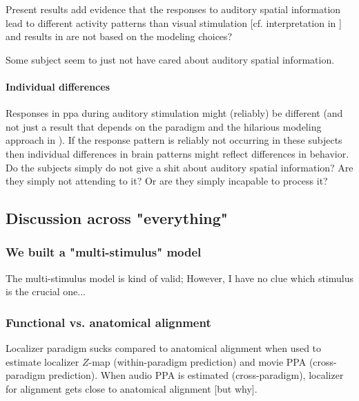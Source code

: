 %
Present results add evidence that the responses to auditory spatial information
lead to different activity patterns than visual stimulation [cf. interpretation
in \citet{haeusler2022processing}] and results in \citet{haeusler2022processing}
are not based on the modeling choices?

%
Some subject seem to just not have cared about auditory spatial information.


\paragraph{Individual differences}

%
Responses in \ac{ppa} during auditory stimulation might (reliably) be
different (and not just a result that depends on the paradigm and the hilarious
modeling approach in \citet{haeusler2022processing}).
%
If the response pattern is reliably not occurring in these subjects then
individual differences in brain patterns might reflect differences in behavior.
%
Do the subjects simply do not give a shit about auditory spatial information?
%
Are they simply not attending to it? Or are they simply incapable to process it?




\subsection{Discussion across "everything"}

\subsubsection{We built a "multi-stimulus" model}



The multi-stimulus model is kind of valid;
%
However, I have no clue which stimulus is the crucial one...


\subsubsection{Functional vs. anatomical alignment}

Localizer paradigm sucks compared to anatomical alignment when used to estimate
localizer $Z$-map (within-paradigm prediction) and movie PPA (cross-paradigm
prediction).
%
When audio PPA is estimated (cross-paradigm), localizer for alignment gets close
to anatomical alignment [but why].

